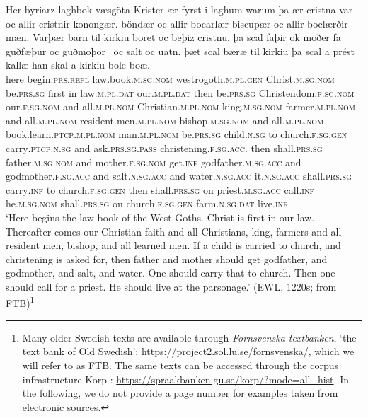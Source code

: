 \documentclass[output=paper]{langscibook}
\begin{document}
\ea    \label{ex:intro:2}
\gll  Her   byriarz                 laghbok                     væsgöta Krister               ær           fyrst   i     laghum           warum           þa ær           cristna                       var                  oc   allir cristnir                   konongær.         böndær               oc   allir bocarlær                       biscupær               oc     allir boclærðir                       mæn.               Varþær       barn           til kirkiu                 boret                 oc   beþiz                   cristnu. þa     scal         faþir           ok   moðer           fa guðfæþur         oc    guðmoþor~      oc   salt         oc   uatn. þæt           scal        bæræ      til   kirkiu         þa   scal a   prést                 kallæ   han                 skal               a     kirkiu bole                       boæ.\\
here   begin.\textsc{prs.refl}     law.book.\textsc{m.sg.nom}     westrogoth.\textsc{m.pl.gen} Christ.\textsc{m.sg.nom}   be.\textsc{prs.sg}     first   in   law\textsc{.m.pl.dat}   our\textsc{.m.pl.dat}   then be.\textsc{prs.sg} Christendom\textsc{.f.sg.nom}   our\textsc{.f.sg.nom}   and   all.\textsc{m.pl.nom} Christian.\textsc{m.pl.nom}   king.\textsc{m.sg.nom}  farmer.\textsc{m.pl.nom}    and  all.\textsc{m.pl.nom} resident.men.\textsc{m.pl.nom}    bishop.\textsc{m.sg.nom}   and    all.\textsc{m.pl.nom} book.learn.\textsc{ptcp}.\textsc{m.pl.nom}   man.\textsc{m.pl.nom}   be.\textsc{prs.sg}     child\textsc{.n.sg}   to  church\textsc{.f.sg.gen}   carry\textsc{.ptcp.n.sg}  and ask.\textsc{prs.sg.pass}   christening\textsc{.f.sg.acc.} then   shall\textsc{.prs.sg}   father\textsc{.m.sg.nom}   and   mother\textsc{.f.sg.nom}   get.\textsc{inf} godfather\textsc{.m.sg.acc} and godmother\textsc{.f.sg.acc}   and salt.\textsc{n.sg.acc}   and   water\textsc{.n.sg.acc} it.\textsc{n.sg.acc}   shall\textsc{.prs.sg}   carry\textsc{.inf}     to   church\textsc{.f.sg.gen}   then   shall\textsc{.prs.sg} on priest\textsc{.m.sg.acc}   call\textsc{.inf}   he\textsc{.m.sg.nom}    shall\textsc{.prs.sg}     on   church\textsc{.f.sg.gen} farm.\textsc{n.sg.dat}         live\textsc{.inf}\\
\glt ‘Here begins the law book of the West Goths. Christ is first in our law. Thereafter comes our Christian faith and all Christians, king, farmers and all resident men, bishop, and all learned men. If a child is carried to church, and christening is asked for, then father and mother should get godfather, and godmother, and salt, and water. One should carry that to church. Then one should call for a priest. He should live at the parsonage.’ (EWL, 1220s; from FTB)\footnote{Many older Swedish texts are available through \textit{Fornsvenska textbanken}, ‘the text bank of Old Swedish’: \url{https://project2.sol.lu.se/fornsvenska/}, which we will refer to as FTB. The same texts can be accessed through the corpus infrastructure Korp \citep{BorinEtAl2012}: \url{https://spraakbanken.gu.se/korp/?mode=all_hist}. In the following, we do not provide a page number for examples taken from electronic sources.}
\z
\end{document}
